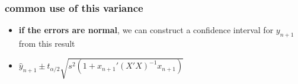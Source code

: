 \subsubsection{common use of this variance}

\begin{itemize}[leftmargin=0pt]
\item \textbf{if the errors are normal}, we can construct a confidence
       interval for $y_{n+1}$ from this result
\item $\hat y_{n+1} \pm t_{\alpha/2} \sqrt{s^2 (1 + x_{n+1}'(X'X)^{-1}x_{n+1})}$
\end{itemize}

